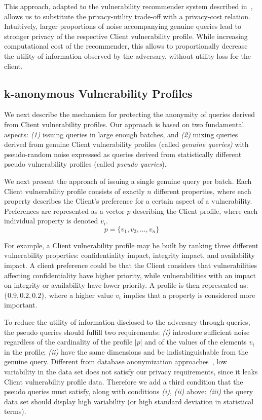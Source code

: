 {This approach, adapted to the vulnerability recommender system described in~\cite{cobleigh:2018}, allows us to substitute the privacy-utility trade-off with a privacy-cost relation.
Intuitively, larger proportions of noise accompanying genuine queries lead to stronger privacy of the respective Client vulnerability profile.
While increasing computational cost of the recommender, this allows to proportionally decrease the utility of information observed by the adversary, without utility loss for the client.

\subsection{k-anonymous Vulnerability Profiles}
\label{subsec:solution-diff-privacy}
We next describe the mechanism for protecting the anonymity of queries derived from Client vulnerability profiles.
Our approach is based on two fundamental aspects: 
\textit{(1)} issuing queries in large enough batches, and 
\textit{(2)} mixing queries derived from genuine Client vulnerability profiles (called \textit{genuine queries)} with pseudo-random noise expressed as queries derived from statistically different pseudo vulnerability profiles (called \textit{pseudo queries}).

We next present the approach of issuing a single genuine query per batch.
Each Client vulnerability profile consists of exactly $n$ different properties, where each property describes the Client's preference for a certain aspect of a vulnerability.
Preferences are represented as a vector $p$ describing the Client profile, where each individual property is denoted $v_i$.
\begin{equation}
p = \{v_1, v_2, \ldots, v_n\}
\end{equation}

For example, a Client vulnerability profile may be built by ranking three different vulnerability properties: 
confidentiality impact, 
integrity impact, 
and availability impact.
A client preference could be that the Client considers that vulnerabilities affecting confidentiality have higher priority, while vulnerabilities with an impact on integrity or availability have lower priority.
A profile is then represented as: $\{0.9, 0.2, 0.2\}$, where a higher value $v_i$ implies that a property is considered more important.

To reduce the utility of information disclosed to the adversary through queries, the pseudo queries should fulfill two requirements:
\textit{(i)} introduce sufficient noise regardless of the cardinality of the profile $|p|$ and of the values of the elements $v_i$ in the profile;
\textit{(ii)} have the same dimensions and be indistinguishable from the genuine query.
Different from database anonymization approaches~\cite{samarati:1998, samarati:2001, holohan:2017}, low variability in the data set does not satisfy our privacy requirements, since it leaks Client vulnerability profile data.
Therefore we add a third condition that the pseudo queries must satisfy, along with conditions \textit{(i)}, \textit{(ii)} above:
\textit{(iii)} the query data set should display high variability (or high standard deviation in statistical terms).

}
